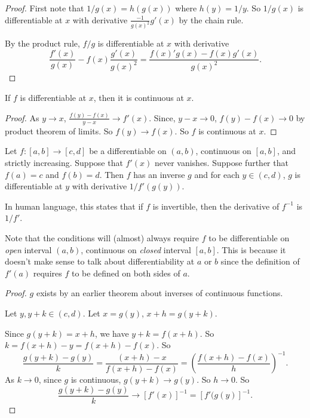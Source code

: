 \documentclass[a4paper]{article}
\begin{document}
\begin{proof}
  First note that $1/g(x) = h(g(x))$ where $h(y) = 1/y$. So $1/g(x)$ is differentiable at $x$ with derivative $\displaystyle \frac{-1}{g(x)^2}g'(x)$ by the chain rule.

  By the product rule, $f/g$ is differentiable at $x$ with derivative
  \[
    \frac{f'(x)}{g(x)} - f(x)\frac{g'(x)}{g(x)^2} = \frac{f(x)'g(x) - f(x)g'(x)}{g(x)^2}.
  \]
\end{proof}
\begin{lemma}
  If $f$ is differentiable at $x$, then it is continuous at $x$.
\end{lemma}

\begin{proof}
  As $y\to x$, $\displaystyle \frac{f(y) - f(x)}{y - x} \to f'(x)$. Since, $y - x \to 0$, $f(y) - f(x) \to 0$ by product theorem of limits. So $f(y) \to f(x)$. So $f$ is continuous at $x$.
\end{proof}

\begin{thm}
  Let $f:[a, b]\to [c, d]$ be a differentiable on $(a, b)$, continuous on $[a, b]$, and strictly increasing. Suppose that $f'(x)$ never vanishes. Suppose further that $f(a) = c$ and $f(b) = d$. Then $f$ has an inverse $g$ and for each $y\in (c, d)$, $g$ is differentiable at $y$ with derivative $1/f'(g(y))$.

  In human language, this states that if $f$ is invertible, then the derivative of $f^{-1}$ is $1/f'$.
\end{thm}
Note that the conditions will (almost) always require $f$ to be differentiable on \emph{open} interval $(a, b)$, continuous on \emph{closed} interval $[a, b]$. This is because it doesn't make sense to talk about differentiability at $a$ or $b$ since the definition of $f'(a)$ requires $f$ to be defined on both sides of $a$.

\begin{proof}
  $g$ exists by an earlier theorem about inverses of continuous functions.

  Let $y, y + k\in (c, d)$. Let $x = g(y)$, $x + h = g(y + k)$.

  Since $g(y + k) = x + h$, we have $y + k = f(x + h)$. So $k = f(x + h) - y = f(x + h) - f(x)$. So
  \[
    \frac{g(y + k) - g(y)}{k} = \frac{(x + h) - x}{f(x + h) - f(x)} = \left(\frac{f(x + h) - f(x)}{h}\right)^{-1}.
  \]
  As $k \to 0$, since $g$ is continuous, $g(y + k) \to g(y)$. So $h \to 0$. So
  \[
    \frac{g(y + k) - g(y)}{k} \to [f'(x)]^{-1} = [f'(g(y)]^{-1}.
  \]
\end{proof}
\end{document}
